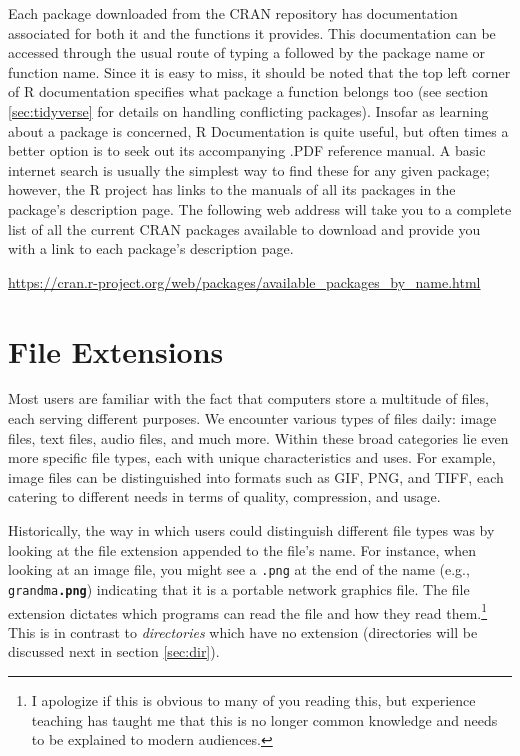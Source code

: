 Each package downloaded from the CRAN repository has documentation associated for both it and the functions it provides.  This documentation can be accessed through the usual route of typing a  followed by the package name or function name.  Since it is easy to miss, it should be noted that the top left corner of R documentation specifies what package a function belongs too (see section \ref{sec:tidyverse} for details on handling conflicting packages). Insofar as learning about a package is concerned, R Documentation is quite useful, but often times a better option is to seek out its accompanying .PDF reference manual.  A basic internet search is usually the simplest way to find these for any given package; however, the R project has links to the manuals of all its packages in the package's description page. The following web address will take you to a complete list of all the current CRAN packages available to download and provide you with a link to each package's description page.

\begin{center}
\url{https://cran.r-project.org/web/packages/available_packages_by_name.html}
\end{center}

\section{File Extensions}

Most users are familiar with the fact that computers store a multitude of files, each serving different purposes. We encounter various types of files daily: image files, text files, audio files, and much more. Within these broad categories lie even more specific file types, each with unique characteristics and uses. For example, image files can be distinguished into formats such as GIF, PNG, and TIFF, each catering to different needs in terms of quality, compression, and usage.

Historically, the way in which users could distinguish different file types was by looking at the \gls{file extension} appended to the file's name. For instance, when looking at an image file, you might see a \texttt{.png} at the end of the name (e.g., \texttt{grandma\textbf{.png}}) indicating that it is a portable network graphics file. The file extension dictates which programs can read the file and how they read them.\footnote{I apologize if this is obvious to many of you reading this, but experience teaching has taught me that this is no longer common knowledge and needs to be explained to modern audiences.} This is in contrast to \textit{directories} which have no extension (directories will be discussed next in section \ref{sec:dir}).

